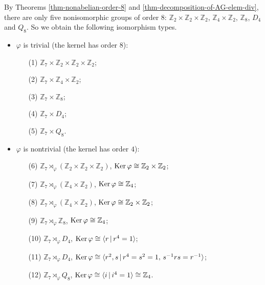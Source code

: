 \begin{example}
	 By Theorems \ref{thm-nonabelian-order-8} and  \ref{thm-decomposition-of-AG-elem-div}, there are only five nonisomorphic groups of order $8$: $\mathbb{Z}_2\times \mathbb{Z}_2\times \mathbb{Z}_2$, $\mathbb{Z}_4\times \mathbb{Z}_2$, $\mathbb{Z}_8$, $D_4$ and $Q_8$. So we obtain the following  isomorphism types.
	\begin{itemize}
		\item $\varphi$ is trivial (the kernel has order $8$):
		\begin{itemize}
			\item[(1)] $\mathbb{Z}_7\times \mathbb{Z}_2\times \mathbb{Z}_2\times \mathbb{Z}_2$;
			\item[(2)] $\mathbb{Z}_7\times \mathbb{Z}_4\times \mathbb{Z}_2$;
			\item[(3)] $\mathbb{Z}_7\times \mathbb{Z}_8$;
			\item[(4)] $\mathbb{Z}_7\times D_4$;
			\item[(5)] $\mathbb{Z}_7\times Q_8$.
		\end{itemize}
		\item $\varphi$ is nontrivial (the kernel has order $4$):
		\begin{itemize}
			\item[(6)] $\mathbb{Z}_7\rtimes_{\varphi} (\mathbb{Z}_2\times \mathbb{Z}_2\times \mathbb{Z}_2)$, $\operatorname{Ker}\varphi \cong \mathbb{Z}_2\times \mathbb{Z}_2$;
			\item[(7)] $\mathbb{Z}_7\rtimes_{\varphi} (\mathbb{Z}_4\times \mathbb{Z}_2)$, $\operatorname{Ker}\varphi \cong \mathbb{Z}_4$;
			\item[(8)] $\mathbb{Z}_7\rtimes_{\varphi} (\mathbb{Z}_4\times \mathbb{Z}_2)$, $\operatorname{Ker}\varphi \cong  \mathbb{Z}_2\times \mathbb{Z}_2$;
			\item[(9)] $\mathbb{Z}_7\rtimes_{\varphi} \mathbb{Z}_8$, $\operatorname{Ker}\varphi \cong \mathbb{Z}_4$;
			\item[(10)] $\mathbb{Z}_7\rtimes_{\varphi} D_4$, $\operatorname{Ker}\varphi \cong \langle r\,|\, r^4=1 \rangle$;
			\item[(11)] $\mathbb{Z}_7\rtimes_{\varphi} D_4$, $\operatorname{Ker}\varphi \cong \langle r^2,s\,|\, r^4=s^2=1 ,\, s^{-1}rs = r^{-1}\rangle$;
			\item[(12)] $\mathbb{Z}_7\rtimes_{\varphi} Q_8$, $\operatorname{Ker}\varphi \cong \langle i\,|\, i^4=1 \rangle \cong \mathbb{Z}_4$.
		\end{itemize}
	\end{itemize}
	

\end{example}
